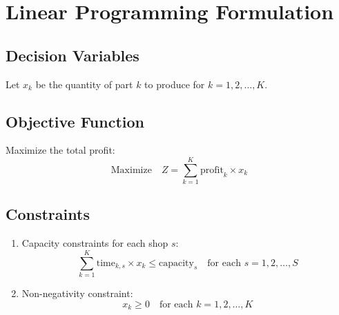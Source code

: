 \documentclass{article}
\begin{document}
\section*{Linear Programming Formulation}

\subsection*{Decision Variables}
Let \( x_k \) be the quantity of part \( k \) to produce for \( k = 1, 2, \ldots, K \).

\subsection*{Objective Function}
Maximize the total profit:
\[
\text{Maximize} \quad Z = \sum_{k=1}^{K} \text{profit}_{k} \times x_k
\]

\subsection*{Constraints}
\begin{enumerate}
    \item Capacity constraints for each shop \( s \):
    \[
    \sum_{k=1}^{K} \text{time}_{k, s} \times x_k \leq \text{capacity}_{s} \quad \text{for each } s = 1, 2, \ldots, S
    \]
    \item Non-negativity constraint:
    \[
    x_k \geq 0 \quad \text{for each } k = 1, 2, \ldots, K
    \]
\end{enumerate}
\end{document}

